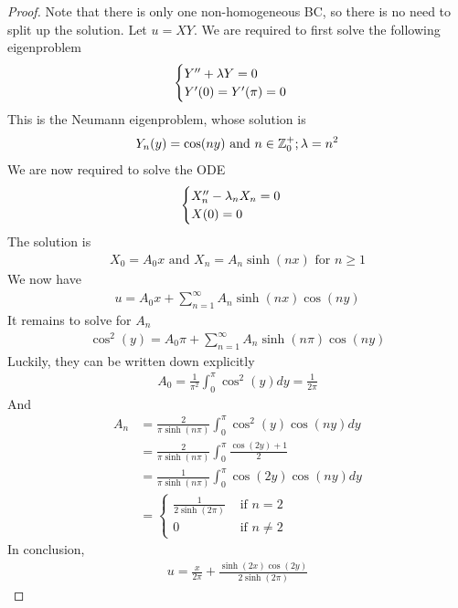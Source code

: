 \documentclass{report}
\begin{document}
\begin{proof}
Note that there is only one non-homogeneous BC, so there is no need to split up the solution. Let $u=XY$. We are required to first solve the following eigenproblem 
\begin{align*}
\begin{cases}  
Y'' + \lambda  Y=0 \\
Y'(0)=Y'(\pi )=0
\end{cases}
\end{align*}
This is the Neumann eigenproblem, whose solution is 
\begin{align*}
Y_n (y)= \cos (ny)\text{ and }n\in\mathbb{Z}_0^+;\lambda =n^2
\end{align*}
We are now required to solve the ODE 
\begin{align*}
\begin{cases}  
X''_n - \lambda_n X_n=0  \\
X(0)=0
\end{cases}
\end{align*}
The solution is  
\begin{align*}
X_0=A_0x\text{ and } X_n= A_n \sinh (nx)\text{ for }n\geq 1
\end{align*}
We now have 
\begin{align*}
u=A_0x+ \sum_{n=1}^{\infty} A_n \sinh (nx) \cos (ny)
\end{align*}
It remains to solve for $A_n$ 
 \begin{align*}
\cos^2 (y)= A_0\pi  + \sum_{n=1}^{\infty}A_n \sinh (n \pi )\cos (ny)
\end{align*}
Luckily, they can be written down explicitly 
\begin{align*}
 A_0=\frac{1}{\pi ^2}\int_0^{\pi }\cos^2 (y) dy= \frac{1}{2\pi } 
\end{align*}
And 
\begin{align*}
A_n&=\frac{2}{\pi  \sinh (n \pi  )}\int_0^{\pi }\cos^2(y) \cos (ny)dy \\
&=\frac{2}{\pi  \sinh (n \pi )}\int_0^{\pi } \frac{\cos (2y)+1}{2} \\
&=\frac{1}{\pi  \sinh (n \pi )} \int_0^{\pi } \cos (2y) \cos (ny) dy\\
&=\begin{cases}
  \frac{1}{2 \sinh (2\pi )}& \text{ if $n=2$ }\\
  0& \text{ if $n\neq 2$ }
\end{cases}
\end{align*}
In conclusion, 
\begin{align*}
u= \frac{x}{2\pi  }+ \frac{\sinh (2x)\cos (2y)}{2\sinh (2\pi )}
\end{align*}
\end{proof}
\end{document}
